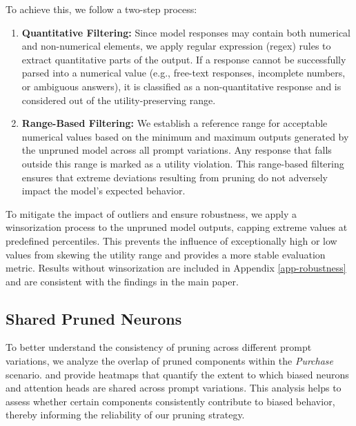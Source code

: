 To achieve this, we follow a two-step process:

\begin{enumerate}
    \item \textbf{Quantitative Filtering:} 
    Since model responses may contain both numerical and non-numerical elements, we apply regular expression (regex) rules to extract quantitative parts of the output. If a response cannot be successfully parsed into a numerical value (e.g., free-text responses, incomplete numbers, or ambiguous answers), it is classified as a non-quantitative response and is considered out of the utility-preserving range.

    \item \textbf{Range-Based Filtering:} 
    We establish a reference range for acceptable numerical values based on the minimum and maximum outputs generated by the unpruned model across all prompt variations. Any response that falls outside this range is marked as a utility violation. This range-based filtering ensures that extreme deviations resulting from pruning do not adversely impact the model’s expected behavior.
\end{enumerate}

To mitigate the impact of outliers and ensure robustness, we apply a winsorization process to the unpruned model outputs, capping extreme values at predefined percentiles. This prevents the influence of exceptionally high or low values from skewing the utility range and provides a more stable evaluation metric. Results without winsorization are included in Appendix \ref{app-robustness} and are consistent with the findings in the main paper.


\subsection{Shared Pruned Neurons}
\label{app-shared-neurons}
To better understand the consistency of pruning across different prompt variations, we analyze the overlap of pruned components within the \textit{Purchase} scenario.  and  provide heatmaps that quantify the extent to which biased neurons and attention heads are shared across prompt variations. This analysis helps to assess whether certain components consistently contribute to biased behavior, thereby informing the reliability of our pruning strategy.

